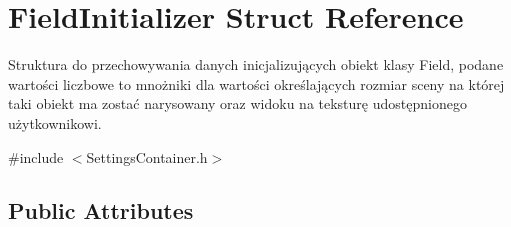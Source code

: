 \hypertarget{struct_field_initializer}{}\section{Field\+Initializer Struct Reference}
\label{struct_field_initializer}


Struktura do przechowywania danych inicjalizujących obiekt klasy Field, podane wartości liczbowe to mnożniki dla wartości określających rozmiar sceny na której taki obiekt ma zostać narysowany oraz widoku na teksturę udostępnionego użytkownikowi.  




{\ttfamily \#include $<$Settings\+Container.\+h$>$}

\subsection*{Public Attributes}
